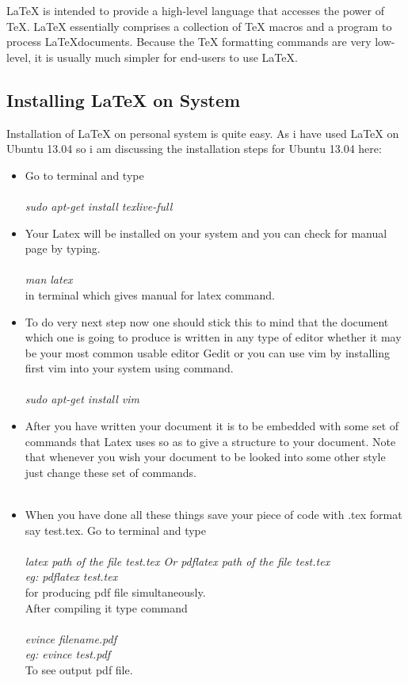 \LaTeX{} is intended to provide a high-level language that
accesses the power of \TeX. \LaTeX{} essentially comprises a
collection of \TeX{} macros and a program to process \LaTeX documents. 
Because the \TeX{} formatting commands are very low-level, it is usually 
much simpler for end-users to use \LaTeX{}.

\subsection{Installing \LaTeX{} on System}
Installation of \LaTeX{} on personal system is quite easy. As i have used \LaTeX{} on Ubuntu 13.04 so i am discussing the installation steps for Ubuntu 13.04 here:
\begin{itemize}
\item Go to terminal and type\\\\
\textit{sudo apt-get install texlive-full}
\item Your Latex will be installed on your system and you can check for manual page by typing.\\\\
\textit{man latex}\\
in terminal which gives manual for latex command.\\
\item To do very next step now one should stick this to mind that the document which one is going to produce is written in any type of editor whether it may be your most common usable editor Gedit or you can use vim by installing first vim into your system using command.\\\\
\textit{sudo apt-get install vim}\\
\item After you have written your document it is to be embedded with some set of commands that Latex uses so as to give a structure to your document. Note that whenever you wish your document to be looked into some other style just change these set of commands.\\\\
\item When you have done all these things save your piece of code with .tex format say test.tex. Go to terminal and type\\\\
\textit{latex path of the file test.tex Or pdflatex path of the file test.tex\\ eg: pdflatex test.tex}\\
for producing pdf file simultaneously.\\
After compiling it type command\\\\
\textit{evince filename.pdf\\ eg: evince test.pdf}\\
To see output pdf file. 
\end{itemize}

